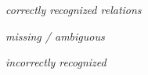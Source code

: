 \documentclass[10pt,twocolumn,letterpaper]{article}
\begin{document}
\begin{figure*}[t]
\centering
	\begin{minipage}[b]{0.6\textwidth}
    \centering
    	\textit{correctly recognized relations}\\
    	\vspace{0.4ex}
	\end{minipage}
	\hspace{0.005\textwidth}
	\begin{minipage}[b]{0.18\textwidth}
    \centering
    	\textit{missing / ambiguous}\\
    	\vspace{0.4ex}
	\end{minipage}
	\hspace{0.005\textwidth}
	\begin{minipage}[b]{0.19\textwidth}
    \centering
    	\textit{incorrectly recognized}\\
    	\vspace{0.4ex}
	\end{minipage}
	

\end{figure*}
\end{document}
